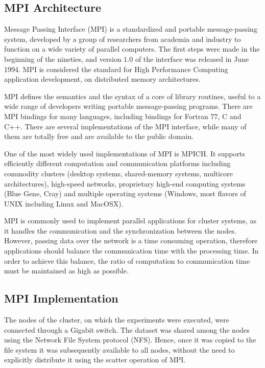 \documentclass{ws-ijait}
\begin{document}
\clearpage

\subsection{MPI Architecture}
Message Passing Interface (MPI) is a standardized and portable message-passing system, developed by a group of researchers from academia and industry to function on a wide variety of parallel computers. The first steps were made in the beginning of the nineties, and version $1.0$ of the interface was released in June 1994. MPI is considered the standard for High Performance Computing application development, on distributed memory architectures.\cite{Yang2011266}

MPI defines the semantics and the syntax of a core of library routines, useful to a wide range of developers writing portable message-passing programs. There are MPI bindings for many languages, including bindings for Fortran $77$, C and C++. There are several implementations of the MPI interface, while many of them are totally free and are available to the public domain.

One of the most widely used implementations of MPI is MPICH.\cite{mpich} It supports efficiently different computation and communication platforms including commodity clusters (desktop systems, shared-memory systems, multicore architectures), high-speed networks, proprietary high-end computing systems (Blue Gene, Cray) and multiple operating systems (Windows, most flavors of UNIX including Linux and MacOSX).

MPI is commonly used to implement parallel applications for cluster systems, as it handles the communication and the synchronization between the nodes. However, passing data over the network is a time consuming operation, therefore applications should balance the communication time with the processing time. In order to achieve this balance, the ratio of computation to communication time must be maintained as high as possible.

\subsection{MPI Implementation}
The nodes of the cluster, on which the experiments were executed, were connected through a Gigabit switch. The dataset was shared among the nodes using the Network File System\cite{Callaghan2000} protocol (NFS). Hence, once it was copied to the file system it was subsequently available to all nodes, without the need to explicitly distribute it using the scatter operation of MPI.
\end{document}
